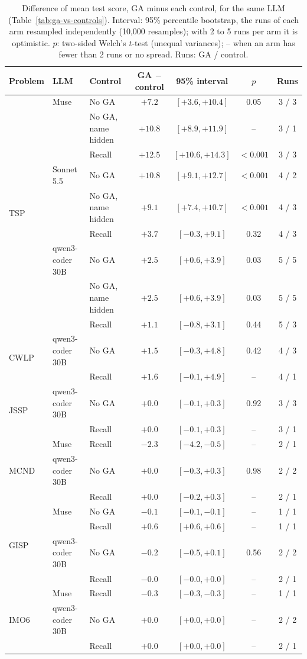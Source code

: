 \begin{table}[t]
\centering
\small
\caption{Difference of mean test score, GA minus each control, for the same LLM (Table~\ref{tab:ga-vs-controls}). Interval: 95\% percentile bootstrap, the runs of each arm resampled independently (10,000 resamples); with 2 to 5 runs per arm it is optimistic. $p$: two-sided Welch's $t$-test (unequal variances); -- when an arm has fewer than 2 runs or no spread. Runs: GA / control.}
\label{tab:ga-minus-controls}
\begin{tabular}{@{}l l l c c c c@{}}
\toprule
Problem & LLM & Control & GA $-$ control & 95\% interval & $p$ & Runs \\
\midrule
\multirow{9}{*}{TSP} & Muse & No GA & $+7.2$ & $[+3.6, +10.4]$ & 0.05 & 3 / 3 \\
 &  & No GA, name hidden & $+10.8$ & $[+8.9, +11.9]$ & -- & 3 / 1 \\
 &  & Recall & $+12.5$ & $[+10.6, +14.3]$ & $<0.001$ & 3 / 3 \\
 & Sonnet 5.5 & No GA & $+10.8$ & $[+9.1, +12.7]$ & $<0.001$ & 4 / 2 \\
 &  & No GA, name hidden & $+9.1$ & $[+7.4, +10.7]$ & $<0.001$ & 4 / 3 \\
 &  & Recall & $+3.7$ & $[-0.3, +9.1]$ & 0.32 & 4 / 3 \\
 & qwen3-coder 30B & No GA & $+2.5$ & $[+0.6, +3.9]$ & 0.03 & 5 / 5 \\
 &  & No GA, name hidden & $+2.5$ & $[+0.6, +3.9]$ & 0.03 & 5 / 5 \\
 &  & Recall & $+1.1$ & $[-0.8, +3.1]$ & 0.44 & 5 / 3 \\
\midrule
\multirow{2}{*}{CWLP} & qwen3-coder 30B & No GA & $+1.5$ & $[-0.3, +4.8]$ & 0.42 & 4 / 3 \\
 &  & Recall & $+1.6$ & $[-0.1, +4.9]$ & -- & 4 / 1 \\
\midrule
\multirow{2}{*}{JSSP} & qwen3-coder 30B & No GA & $+0.0$ & $[-0.1, +0.3]$ & 0.92 & 3 / 3 \\
 &  & Recall & $+0.0$ & $[-0.1, +0.3]$ & -- & 3 / 1 \\
\midrule
\multirow{3}{*}{MCND} & Muse & Recall & $-2.3$ & $[-4.2, -0.5]$ & -- & 2 / 1 \\
 & qwen3-coder 30B & No GA & $+0.0$ & $[-0.3, +0.3]$ & 0.98 & 2 / 2 \\
 &  & Recall & $+0.0$ & $[-0.2, +0.3]$ & -- & 2 / 1 \\
\midrule
\multirow{4}{*}{GISP} & Muse & No GA & $-0.1$ & $[-0.1, -0.1]$ & -- & 1 / 1 \\
 &  & Recall & $+0.6$ & $[+0.6, +0.6]$ & -- & 1 / 1 \\
 & qwen3-coder 30B & No GA & $-0.2$ & $[-0.5, +0.1]$ & 0.56 & 2 / 2 \\
 &  & Recall & $-0.0$ & $[-0.0, +0.0]$ & -- & 2 / 1 \\
\midrule
\multirow{3}{*}{IMO6} & Muse & Recall & $-0.3$ & $[-0.3, -0.3]$ & -- & 1 / 1 \\
 & qwen3-coder 30B & No GA & $+0.0$ & $[+0.0, +0.0]$ & -- & 2 / 2 \\
 &  & Recall & $+0.0$ & $[+0.0, +0.0]$ & -- & 2 / 1 \\
\bottomrule
\end{tabular}
\end{table}
